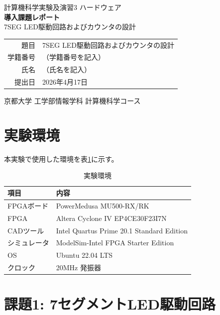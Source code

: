 \documentclass[a4paper,11pt]{ltjsarticle}
\begin{document}
\begin{titlepage}
\centering
\vspace*{3cm}
{\LARGE 計算機科学実験及演習3 ハードウェア}\\[1cm]
{\Huge\bfseries 導入課題レポート}\\[0.5cm]
{\LARGE 7SEG LED駆動回路およびカウンタの設計}\\[3cm]

\begin{tabular}{rl}
題目   & 7SEG LED駆動回路およびカウンタの設計 \\[0.5em]
学籍番号 & （学籍番号を記入） \\[0.5em]
氏名   & （氏名を記入） \\[0.5em]
提出日  & 2026年4月17日 \\
\end{tabular}

\vfill
京都大学 工学部情報学科 計算機科学コース
\end{titlepage}

\tableofcontents
\clearpage

\section{実験環境}

本実験で使用した環境を表\ref{tab:env}に示す。

\begin{table}[h]
\centering
\caption{実験環境}
\label{tab:env}
\begin{tabular}{ll}
\toprule
項目 & 内容 \\
\midrule
FPGAボード & PowerMedusa MU500-RX/RK \\
FPGA      & Altera Cyclone IV EP4CE30F23I7N \\
CADツール   & Intel Quartus Prime 20.1 Standard Edition \\
シミュレータ & ModelSim-Intel FPGA Starter Edition \\
OS        & Ubuntu 22.04 LTS \\
クロック    & 20MHz 発振器 \\
\bottomrule
\end{tabular}
\end{table}


\section{課題1: 7セグメントLED駆動回路}
\end{document}
